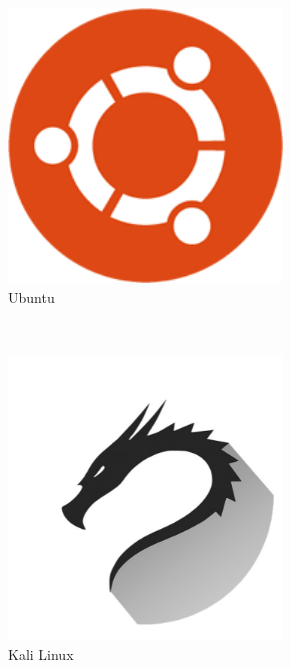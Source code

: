 \documentclass{article}
\begin{document}
\begin{figure}[h]
	\centering
	\begin{subfigure}{0.3\textwidth}
		\includegraphics[width=0.8\textwidth]{ubuntulogo.png}
		\caption{Ubuntu}
	\end{subfigure}
	~
	\begin{subfigure}{0.3\textwidth}
		\includegraphics[width=0.8\textwidth]{kalilogo.png}
		\caption{Kali Linux}
	\end{subfigure}
	~
	\begin{subfigure}{0.3\textwidth}

\end{subfigure}
\end{figure}
\end{document}
